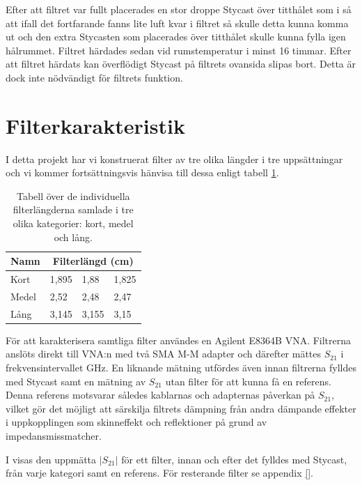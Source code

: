 \documentclass[main.tex]{subfiles}
\begin{document}
Efter att filtret var fullt placerades en stor droppe Stycast över titthålet som i  så att ifall det fortfarande fanns lite luft kvar i filtret så skulle detta kunna komma ut och den extra Stycasten som placerades över titthålet skulle kunna fylla igen hålrummet. Filtret härdades sedan vid rumstemperatur i minst 16 timmar. Efter att filtret härdats kan överflödigt Stycast på filtrets ovansida slipas bort. Detta är dock inte nödvändigt för filtrets funktion.


\section{Filterkarakteristik}
\label{sec:filter_kar}
I detta projekt har vi konstruerat filter av tre olika längder i tre uppsättningar och vi kommer fortsättningsvis hänvisa till dessa enligt tabell \ref{tab:filter_list}.

\begin{table}[h]
    \centering
    \caption{Tabell över de individuella filterlängderna samlade i tre olika kategorier: kort, medel och lång.}
    \label{tab:filter_list}
    \begin{tabular}{llll}\toprule
        Namn & \multicolumn{3}{c}{Filterlängd (\unit{cm})} \\
        \midrule
        Kort & 1,895 & 1,88 & 1,825 \\
        Medel & 2,52 & 2,48 & 2,47 \\
        Lång & 3,145 & 3,155 & 3,15\\
        \bottomrule
    \end{tabular}
\end{table}

För att karakterisera samtliga filter användes en Agilent E8364B VNA. Filtrerna anslöts direkt till VNA:n med två SMA M-M adapter och därefter mättes $S_{21}$ i frekvensintervallet \unit[1-50]{GHz}. En liknande mätning utfördes även innan filtrerna fylldes med Stycast samt en mätning av $S_{21}$ utan filter för att kunna få en referens. Denna referens motsvarar således kablarnas och adapternas påverkan på $S_{21}$, vilket gör det möjligt att särskilja filtrets dämpning från andra dämpande effekter i uppkopplingen som skinneffekt och reflektioner på grund av impedansmissmatcher. 

I  visas den uppmätta $|S_{21}|$ för ett filter, innan och efter det fylldes med Stycast, från varje kategori samt en referens. För resterande filter se appendix \ref{}.
\end{document}
